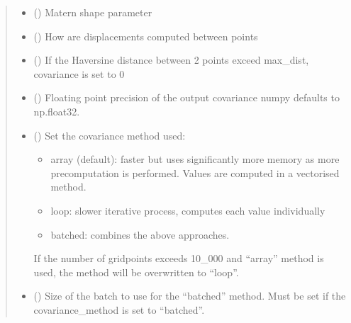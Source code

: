 \documentclass[letterpaper,10pt,english]{sphinxmanual}
\begin{document}
\begin{fulllineitems}
\begin{quote}
\begin{description}
\begin{itemize}
\item {}
\sphinxAtStartPar
{} () \textendash{} Matern shape parameter

\item {}
\sphinxAtStartPar
{} () \textendash{} How are displacements computed between points

\item {}
\sphinxAtStartPar
{} () \textendash{} If the Haversine distance between 2 points exceed max\_dist,
covariance is set to 0

\item {}
\sphinxAtStartPar
{} () \textendash{} Floating point precision of the output covariance numpy defaults to
np.float32.

\item {}
\sphinxAtStartPar
{} () \textendash{}
\sphinxAtStartPar
Set the covariance method used:
\begin{itemize}
\item {}
\sphinxAtStartPar
array (default): faster but uses significantly more memory as
more pre\sphinxhyphen{}computation is performed. Values are computed in a
vectorised method.

\item {}
\sphinxAtStartPar
loop: slower iterative process, computes each value individually

\item {}
\sphinxAtStartPar
batched: combines the above approaches.

\end{itemize}

\sphinxAtStartPar
If the number of grid\sphinxhyphen{}points exceeds 10\_000 and “array” method is used,
the method will be overwritten to “loop”.


\item {}
\sphinxAtStartPar
{} (\sphinxstyleliteralemphasis{\sphinxupquote{ | }}) \textendash{} Size of the batch to use for the “batched” method. Must be set if the
covariance\_method is set to “batched”.


\end{itemize}
\end{description}
\end{quote}
\end{fulllineitems}
\end{document}
